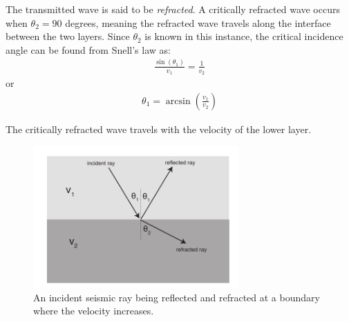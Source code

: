 \documentclass[11pt, oneside]{article}   	%
\begin{document}
The transmitted wave is said to be {\it refracted}. A critically refracted wave occurs when $\theta_2 = 90$ degrees, meaning the refracted wave travels along the interface between the two layers. Since  $\theta_2 $ is known in this instance, the critical incidence angle can be found from Snell's law as:
\begin{eqnarray}
\frac{\sin(\theta_1)}{v_1} = \frac{1}{v_2}
\end{eqnarray}
or
\begin{eqnarray}
\theta_1 = \arcsin\left ( \frac{v_1}{v_2}\right )
\end{eqnarray}

The critically refracted wave travels with the velocity of the lower layer.

\begin{figure}[htbp]
\begin{center}
\includegraphics[width=0.7\textwidth]{SnellsLaw.pdf}
\caption{An incident seismic ray being reflected and refracted at a boundary where the velocity increases. }
\label{sphere}
\end{center}
\end{figure}



 
\end{document}
